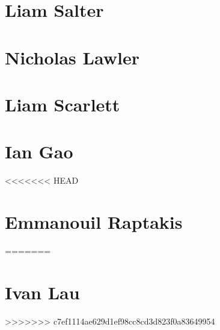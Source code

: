 \documentclass[11pt,a4paper]{report}
\begin{document}
\chapter{Liam Salter}


\chapter{Nicholas Lawler}


\chapter{Liam Scarlett}


\chapter{Ian Gao}


<<<<<<< HEAD
\chapter{Emmanouil Raptakis}

=======
\chapter{Ivan Lau}


>>>>>>> c7ef1114ae629d1ef98cc8cd3d823f0a83649954
\end{document}
